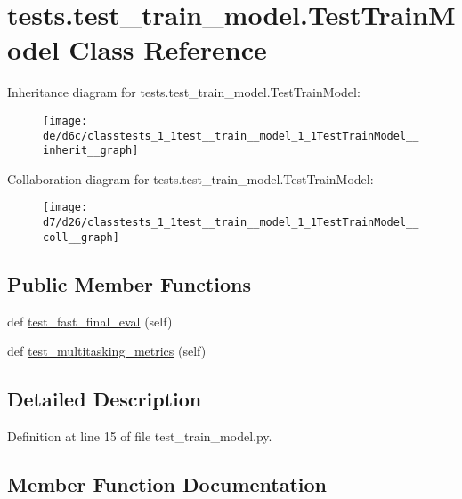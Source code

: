 \hypertarget{classtests_1_1test__train__model_1_1TestTrainModel}{}\section{tests.\+test\+\_\+train\+\_\+model.\+Test\+Train\+Model Class Reference}
\label{classtests_1_1test__train__model_1_1TestTrainModel}


Inheritance diagram for tests.\+test\+\_\+train\+\_\+model.\+Test\+Train\+Model\+:\nopagebreak
\begin{figure}[H]
\begin{center}
\leavevmode
\texttt{[image: de/d6c/classtests\_1\_1test\_\_train\_\_model\_1\_1TestTrainModel\_\_inherit\_\_graph]}
\end{center}
\end{figure}


Collaboration diagram for tests.\+test\+\_\+train\+\_\+model.\+Test\+Train\+Model\+:\nopagebreak
\begin{figure}[H]
\begin{center}
\leavevmode
\texttt{[image: d7/d26/classtests\_1\_1test\_\_train\_\_model\_1\_1TestTrainModel\_\_coll\_\_graph]}
\end{center}
\end{figure}
\subsection*{Public Member Functions}
\begin{DoxyCompactItemize}
\item 
def \hyperlink{classtests_1_1test__train__model_1_1TestTrainModel_affbd00e2cf6b61eae40b5f6e4c1cd8a9}{test\+\_\+fast\+\_\+final\+\_\+eval} (self)
\item 
def \hyperlink{classtests_1_1test__train__model_1_1TestTrainModel_a099516526ea34f8ad88bf921e94c01b9}{test\+\_\+multitasking\+\_\+metrics} (self)
\end{DoxyCompactItemize}


\subsection{Detailed Description}


Definition at line 15 of file test\+\_\+train\+\_\+model.\+py.



\subsection{Member Function Documentation}
\mbox{\label{classtests_1_1test__train__model_1_1TestTrainModel_affbd00e2cf6b61eae40b5f6e4c1cd8a9}} 
